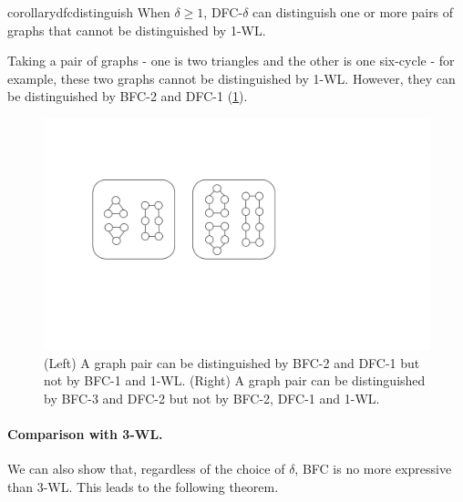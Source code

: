 \begin{restatable}[]{corollary}{dfcdistinguish}
\label{lemma:dfc_distinguish}
When $\delta\geq 1$, DFC-$\delta$ can distinguish one or more pairs of graphs that cannot be distinguished by 1-WL.
\end{restatable}


Taking a pair of graphs - one is two triangles and the other is one six-cycle - for example, these two graphs cannot be distinguished by 1-WL. However, they can be distinguished by BFC-2 and DFC-1 (\cref{fig:circle_examples}).

\begin{figure}[h]
\centering
\includegraphics[clip,width=0.75\columnwidth]{figures/circle_example_new.pdf}
\caption{(Left) A graph pair can be distinguished by BFC-2 and DFC-1 but not by BFC-1 and 1-WL. (Right)  A graph pair can be distinguished by BFC-3 and DFC-2 but not by BFC-2, DFC-1 and 1-WL.}
\label{fig:circle_examples}
\end{figure}




\paragraph{Comparison with 3-WL.}
We can also show that, regardless of the choice of $\delta$, BFC is no more expressive than 3-WL. This leads to the following theorem.


